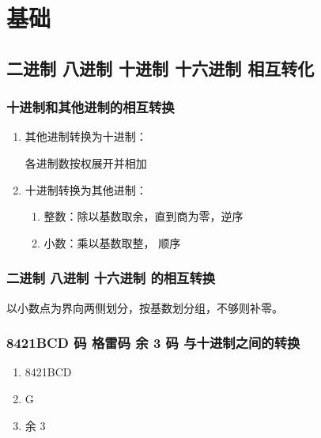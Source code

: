 \chapter{基础}
\newpage

\section{二进制 八进制 十进制 十六进制 相互转化}

\subsection{十进制和其他进制的相互转换}

\begin{enumerate}

    \item 其他进制转换为十进制：

          各进制数按权展开并相加

    \item 十进制转换为其他进制：

          \begin{enumerate}

              \item 整数：除以基数取余，直到商为零，逆序
              \item 小数：乘以基数取整， 顺序

          \end{enumerate}

\end{enumerate}

\subsection{二进制 八进制 十六进制 的相互转换}

以小数点为界向两侧划分，按基数划分组，不够则补零。

\subsection{8421BCD 码 格雷码 余 3 码 与十进制之间的转换}

\begin{enumerate}

    \item 8421BCD
    \item G
    \item 余 3

\end{enumerate}

